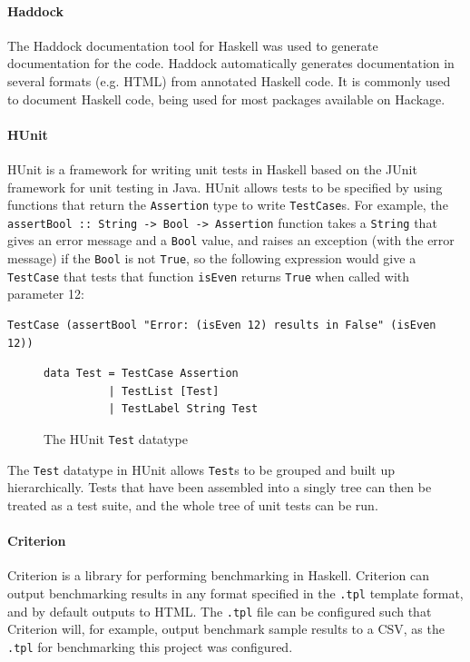 \documentclass[12pt,a4paper,twoside,openright]{report}
\begin{document}
\paragraph{Haddock}{
The Haddock documentation tool for Haskell was used to generate documentation
for the code. Haddock automatically generates documentation in
several formats (e.g. HTML) from annotated Haskell code. It is commonly
used to document Haskell code, being used for most packages available
on Hackage.
}

\paragraph{HUnit}{
HUnit is a framework for writing unit tests in Haskell based on the JUnit framework
for unit testing in Java. HUnit allows tests to be specified by using functions
that return the \verb,Assertion, type to write \verb,TestCase,s. For example, the
\verb,assertBool :: String -> Bool -> Assertion, function takes a \verb,String,
that gives an error message and a \verb,Bool, value, and raises an exception (with
the error message) if the \verb,Bool, is not \verb,True,, so the following
expression would give a \verb,TestCase, that tests that function
\verb,isEven, returns \verb,True, when called with parameter 12:
\begin{verbatim}
TestCase (assertBool "Error: (isEven 12) results in False" (isEven 12))
\end{verbatim}
\begin{figure}[h]
\centering
\begin{verbatim}
data Test = TestCase Assertion
          | TestList [Test]
          | TestLabel String Test
\end{verbatim}
\caption{The HUnit {\tt Test} datatype}
\end{figure}

The \verb,Test, datatype in HUnit allows \verb,Test,s to be grouped
and built up hierarchically. Tests that have been assembled into a
singly tree can then be treated as a test suite, and the whole tree
of unit tests can be run.}

\paragraph{Criterion}{
Criterion is a library for performing benchmarking in Haskell.
Criterion can output benchmarking results in any format specified in the \verb,.tpl,
template format, and by default outputs to HTML.
The \verb,.tpl, file can be configured such that
Criterion will, for example, output benchmark sample results to a CSV, as the
\verb,.tpl, for benchmarking this project was configured.}
\end{document}
